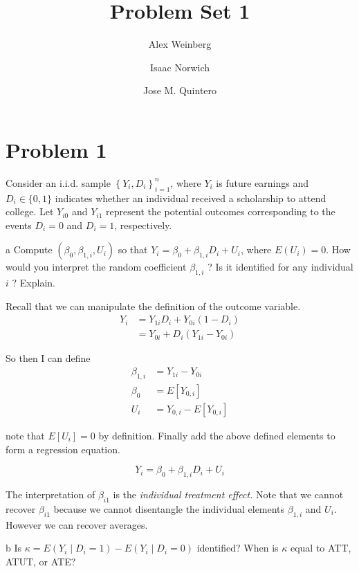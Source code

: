 \documentclass{article}
\title{Problem Set 1}
\author{Alex Weinberg \and Isaac Norwich \and Jose M. Quintero}
\begin{document}
\maketitle
\section*{Problem 1}
Consider an i.i.d. sample $\left\{Y_{i}, D_{i}\right\}_{i=1}^{n}$, where $Y_{i}$ is future earnings and $D_{i} \in\{0,1\}$ indicates whether an individual received a scholarship to attend college. Let $Y_{i 0}$ and $Y_{i 1}$ represent the potential outcomes corresponding to the events $D_{i}=0$ and $D_{i}=1$, respectively.

\begin{problem}{a}
 Compute $\left(\beta_{0}, \beta_{1, i}, U_{i}\right)$ so that $Y_{i}=\beta_{0}+\beta_{1, i} D_{i}+U_{i}$, where $E\left(U_{i}\right)=0$. How would you interpret the random coefficient $\beta_{1, i}$ ? Is it identified for any individual $i$ ? Explain. 
\end{problem}
\begin{solution}
Recall that we can manipulate the definition of the outcome variable.
\begin{align*}
Y_{i} & =Y_{1i}D_{i}+Y_{0i}\left(1-D_{i}\right)\\
 & =Y_{0i}+D_{i}\left(Y_{1i}-Y_{0i}\right)
\end{align*}

So then I can define
\begin{align*}
\beta_{1,i} & =Y_{1i}-Y_{0i}\\
\beta_{0} & =E\left[Y_{0,i}\right]\\
U_{i} & =Y_{0,i}-E\left[Y_{0,i}\right]
\end{align*}

note that $E\left[U_{i}\right]=0$ by definition. Finally add the above defined elements to form a regression equation.

\[
\ensuremath{Y_{i}=\beta_{0}+\beta_{1,i}D_{i}+U_{i}}
\]

The interpretation of $\beta_{i1}$ is the \emph{individual treatment
effect. }Note that we cannot recover $\beta_{i1}$ because we cannot
disentangle the individual elements $\beta_{1,i}$ and $U_{i}$. However
we can recover averages. 
\end{solution}
\begin{problem}{b}
Is $\kappa=E\left(Y_{i} \mid D_{i}=1\right)-E\left(Y_{i} \mid D_{i}=0\right)$ identified? When is $\kappa$ equal to ATT, ATUT, or ATE? \end{problem}
\end{document}
